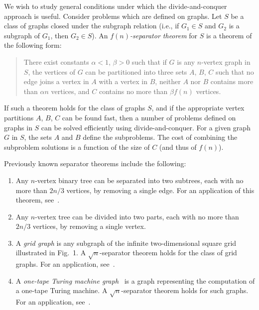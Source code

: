 \documentclass[12pt]{article}
\theoremstyle{remark}
\begin{document}
We wish to study general conditions under which the divide-and-conquer approach
is useful. Consider problems which are defined on graphs. Let $S$ be a class of
graphs closed under the subgraph relation (i.e., if $G_1 \in S$ and $G_2$ is a
subgraph of $G_1$, then $G_2 \in S$). An \emph{$f(n)$-separator theorem} for $S$ is
a theorem of the following form:

\begin{quote}
There exist constants $\alpha < 1$, $\beta > 0$ such that if $G$ is any $n$-vertex
graph in $S$, the vertices of $G$ can be partitioned into three sets $A$, $B$, $C$
such that no edge joins a vertex in $A$ with a vertex in $B$, neither $A$ nor $B$
contains more than $\alpha n$ vertices, and $C$ contains no more than $\beta f(n)$
vertices.
\end{quote}

If such a theorem holds for the class of graphs $S$, and if the appropriate vertex
partitions $A$, $B$, $C$ can be found fast, then a number of problems defined on
graphs in $S$ can be solved efficiently using divide-and-conquer. For a given graph
$G$ in $S$, the sets $A$ and $B$ define the subproblems. The cost of combining the
subproblem solutions is a function of the size of $C$ (and thus of $f(n)$).

Previously known separator theorems include the following:

\begin{enumerate}[label=(\Alph*)]
\item Any $n$-vertex binary tree can be separated into two subtrees, each with no
more than $2n/3$ vertices, by removing a single edge. For an application of this
theorem, see~\cite{lewis65}.

\item Any $n$-vertex tree can be divided into two parts, each with no more than
$2n/3$ vertices, by removing a single vertex.

\item A \emph{grid graph} is any subgraph of the infinite two-dimensional square
grid illustrated in Fig.~1. A $\sqrt{n}$-separator theorem holds for the class of
grid graphs. For an application, see~\cite{george73}.

\item A \emph{one-tape Turing machine graph}~\cite{paul77} is a graph representing
the computation of a one-tape Turing machine. A $\sqrt{n}$-separator theorem holds
for such graphs. For an application, see~\cite{paterson72}.
\end{enumerate}
\end{document}
